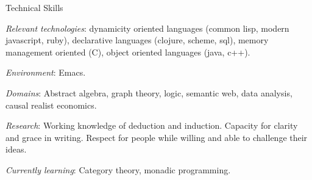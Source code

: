 \begin{rubric}{Technical Skills}{


  \entry* \emph{Relevant technologies}: dynamicity oriented languages
(common lisp, modern javascript, ruby), declarative
languages (clojure, scheme, sql), memory management oriented (C),
object oriented languages (java, c++).

  \entry* \emph{Environment}: Emacs.

  \entry* \emph{Domains}: Abstract algebra, graph theory, logic,
semantic web, data analysis, causal realist economics.

  \entry* \emph{Research}: Working knowledge of deduction and
  induction. Capacity for clarity and grace in writing. Respect for
  people while willing and able to challenge their ideas.

  \entry* \emph{Currently learning}: Category theory, monadic programming.


}\end{rubric}
